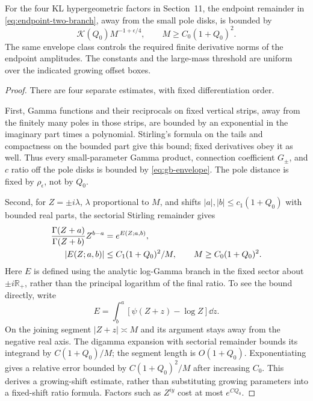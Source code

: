 \begin{lemma}
For the four KL hypergeometric factors in Section~11, the endpoint
remainder in \eqref{eq:endpoint-two-branch}, away from the small pole
disks, is bounded by
\begin{equation}
 \mathcal K(Q_0) M^{-1+\epsilon/4},
 \qquad M\ge C_0(1+Q_0)^2.
 \label{eq:gb-endpoint-bound}
\end{equation}
The same envelope class controls the required finite derivative norms
of the endpoint amplitudes. The constants and the large-mass threshold
are uniform over the indicated growing offset boxes.
\label{lem:gb-endpoint}
\end{lemma}
\begin{proof}
There are four separate estimates, with fixed differentiation order.

First, Gamma functions and their reciprocals on fixed vertical strips,
away from the finitely many poles in those strips, are bounded by an
exponential in the imaginary part times a polynomial. Stirling's formula
on the tails and compactness on the bounded part give this bound; fixed
derivatives obey it as well. Thus every small-parameter Gamma product,
connection coefficient $G_\pm$, and $c$ ratio off the pole disks is
bounded by \eqref{eq:gb-envelope}. The pole distance is fixed by
$\rho_\epsilon$, not by $Q_0$.

Second, for $Z=\pm i\lambda$, $\lambda$ proportional to $M$, and shifts
$|a|,|b|\le c_1(1+Q_0)$ with bounded real parts, the sectorial Stirling
remainder gives
\begin{align}
 \frac{\Gamma(Z+a)}{\Gamma(Z+b)}Z^{b-a}&=e^{E(Z;a,b)},\notag\\
 |E(Z;a,b)|&\le C_1(1+Q_0)^2/M,
 \qquad M\ge C_0(1+Q_0)^2.
 \label{eq:gb-gamma-ratio}
\end{align}
Here $E$ is defined using the analytic log-Gamma branch in the fixed
sector about $\pm i\mathbb R_+$, rather than the principal logarithm
of the final ratio. To see the bound directly, write
\[
 E=\int_b^a[\psi(Z+z)-\log Z]\dd z.
\]
On the joining segment $|Z+z|\asymp M$ and its argument stays away
from the negative real axis. The digamma expansion with sectorial
remainder bounds its integrand by $C(1+Q_0)/M$; the segment length is
$O(1+Q_0)$. Exponentiating gives a relative error bounded by
$C(1+Q_0)^2/M$ after increasing $C_0$. This derives a growing-shift
estimate, rather than substituting growing parameters into a fixed-shift
ratio formula. Factors such as $Z^{i y}$ cost at most $e^{C Q_0}$.


\end{proof}
